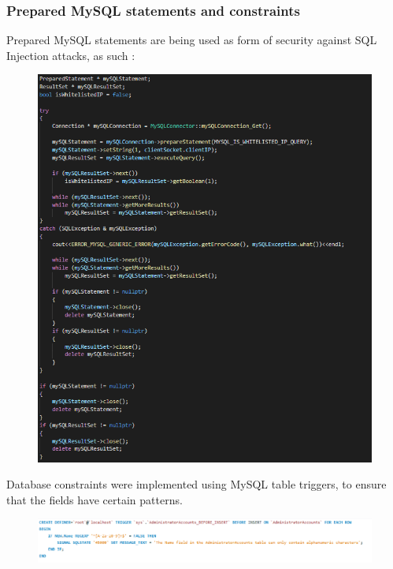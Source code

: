 \documentclass[runningheads]{llncs}
\begin{document}
\subsubsection{Prepared MySQL statements and constraints}
Prepared MySQL statements are being used as form of security against SQL Injection attacks, as such :\\
\begin{figure}[H]
\centering
\includegraphics[width=150mm]{MySQL_Prepared_Statements.png}
\end{figure}

Database constraints were implemented using MySQL table triggers, to ensure that the fields have certain patterns.\\
\begin{figure}[H]
\centering
\includegraphics[width=150mm]{MySQL_Table_Triggers.png}
\end{figure}
\end{document}

